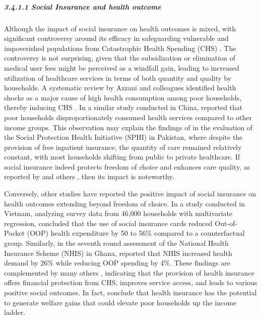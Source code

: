 \paragraph{\quad \quad \textit{3.4.1.1	Social Insurance and health outcome}} 
\subparagraph{}
Although the impact of social insurance on health outcomes is mixed, with significant controversy around its efficacy in safeguarding vulnerable and impoverished populations from Catastrophic Health Spending (CHS) \parencite{korachais_impact_2019, sarkodie_effect_2021}. The controversy is not surprising, given that the subsidization or elimination of medical user fees might be perceived as a windfall gain, leading to increased utilization of healthcare services in terms of both quantity and quality by households. A systematic review by Azzani and colleagues identified health shocks as a major cause of high health consumption among poor households, thereby inducing CHS \parencite{azzani_determinants_2019}. In a similar study conducted in China, \textcite{xu_equity_2021} reported that poor households disproportionately consumed health services compared to other income groups. This observation may explain the findings of \textcite{helmsmuller_does_2022} in the evaluation of the Social Protection Health Initiative (SPHI) in Pakistan, where despite the provision of free inpatient insurance, the quantity of care remained relatively constant, with most households shifting from public to private healthcare. If social insurance indeed protects freedom of choice and enhances care quality, as reported by \textcite{helmsmuller_does_2022} and others \parencite{gajate2015effect, korachais_impact_2019}, then its impact is noteworthy.

Conversely, other studies have reported the positive impact of social insurance on health outcomes extending beyond freedom of choice. In a study conducted in Vietnam, analyzing survey data from 46,000 households with multivariate regression, \textcite{sepehri_how_2014} concluded that the use of social insurance cards reduced Out-of-Pocket (OOP) health expenditure by 50 to 56\% compared to a counterfactual group. Similarly, in the seventh round assessment of the National Health Insurance Scheme (NHIS) in Ghana, \textcite{sarkodie_effect_2021} reported that NHIS increased health demand by 26\% while reducing OOP spending by 4\%. These findings are complemented by many others \parencite{dror_impact_2016, frolich_effects_2018, habib_role_2016, levine_insuring_2016}, indicating that the provision of health insurance offers financial protection from CHS, improves service access, and leads to various positive social outcomes. In fact, \textcite{dror_impact_2016} conclude that health insurance has the potential to generate welfare gains that could elevate poor households up the income ladder.

